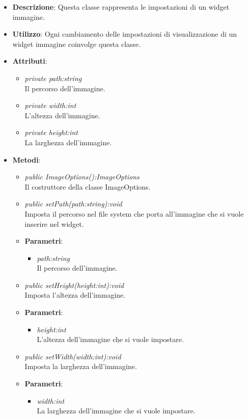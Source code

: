 \begin{itemize}
\item \textbf{Descrizione}: Questa classe rappresenta le impostazioni di un widget immagine.
\item \textbf{Utilizzo}: Ogni cambiamento delle impostazioni di visualizzazione di un widget immagine coinvolge questa classe.
\item \textbf{Attributi}:
	\begin{itemize}
	\item \textit{private path:string}\\
	Il percorso dell'immagine.
	\item \textit{private width:int}\\
	L'altezza dell'immagine. 
	\item \textit{private height:int}\\
	La larghezza dell'immagine. 
	\end{itemize}
\item \textbf{Metodi}:
	\begin{itemize}
	\item \textit{public ImageOptions():ImageOptions}\\
	Il costruttore della classe ImageOptions.
	\item \textit{public setPath(path:string):void}\\
	Imposta il percorso nel file system che porta all'immagine che si vuole inserire nel widget.
		\item{\textbf{Parametri}: \begin{itemize}
		\item \textit{path:string}\\
		Il percorso dell'immagine.
		\end{itemize}}
	\item \textit{public setHeight(height:int):void}\\
	Imposta l'altezza dell'immagine.
		\item{\textbf{Parametri}: \begin{itemize}
		\item \textit{height:int}\\
		L'altezza dell'immagine che si vuole impostare.
		\end{itemize}}
	\item \textit{public setWidth(width:int):void}\\
	Imposta la larghezza dell'immagine.
		\item{\textbf{Parametri}: \begin{itemize}
		\item \textit{width:int}\\
		La larghezza dell'immagine che si vuole impostare.
		\end{itemize}}
	\end{itemize}
\end{itemize}